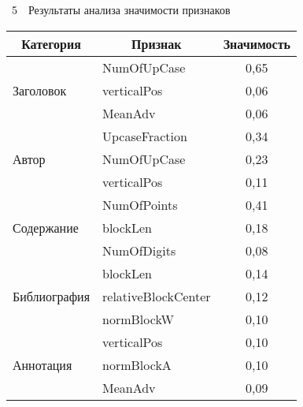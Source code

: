 \begin{multicols}{2}
{\small %
\vspace*{1pt}
    \begin{center}
    \noindent
{{\tablename~5}\ \ \small{Результаты анализа значимости признаков}}
    \vspace*{2ex}
    
    \begin{tabular}{|l|l|c|}
        \hline
 \multicolumn{1}{|c|}{Категория}& \multicolumn{1}{c|}{Признак} &
        \multicolumn{1}{c|}{Значимость} \\
        \hline
        & {NumOfUpCase} & 0,65 \\
{Заголовок}        & {verticalPos} & 0,06 
\\
        & {MeanAdv} & 0,06 \\
          \hline
&  {UpcaseFraction} & 0,34 \\
    Автор     & {NumOfUpCase} & 0,23\\
        & {verticalPos} & 0,11\\
                \hline
 &  NumOfPoints & 0,41\\
        Содержание        & blockLen & 0,18 
\\
        & {NumOfDigits} & 0,08\\
                \hline
&  {blockLen} & 0,14\\
        Библиография  & {relativeBlockCenter} & 
0,12 \\
        & {normBlockW} & 0,10\\
                \hline
 & {verticalPos} & 0,10\\
               Аннотация & normBlockA & 0,10\\
        & MeanAdv & 0,09\\
        \hline  
     \end{tabular}
               \vspace*{1pt}   
   \end{center}
   }

\setcounter{table}{5}

\end{multicols}

\begin{figure*} %
\vspace*{1pt}
 \begin{center}
 \mbox{%
 \epsfxsize=165.062mm 
 }
 \end{center}
\vspace*{-9pt}
    \label{fig:figure3}
\end{figure*}

